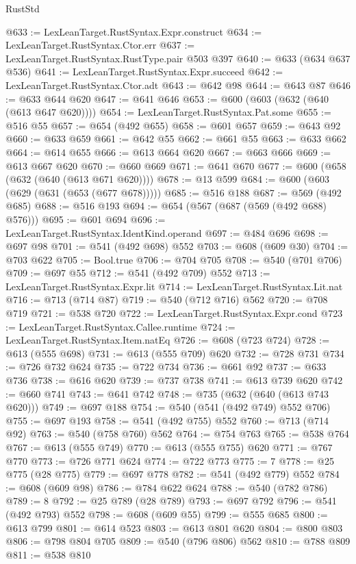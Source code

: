 \begin{lexlean}{RustStd}
\begin{coremodule}
@633 := LexLeanTarget.RustSyntax.Expr.construct
@634 := LexLeanTarget.RustSyntax.Ctor.err
@637 := LexLeanTarget.RustSyntax.RustType.pair @503 @397
@640 := @633 (@634 @637 @536)
@641 := LexLeanTarget.RustSyntax.Expr.succeed
@642 := LexLeanTarget.RustSyntax.Ctor.adt
@643 := @642 @98
@644 := @643 @87
@646 := @633 @644 @620
@647 := @641 @646
@653 := @600 (@603 (@632 (@640 (@613 @647 @620))))
@654 := LexLeanTarget.RustSyntax.Pat.some
@655 := @516 @55
@657 := @654 (@492 @655)
@658 := @601 @657
@659 := @643 @92
@660 := @633 @659
@661 := @642 @55
@662 := @661 @55
@663 := @633 @662
@664 := @614 @655
@666 := @613 @664 @620
@667 := @663 @666
@669 := @613 @667 @620
@670 := @660 @669
@671 := @641 @670
@677 := @600 (@658 (@632 (@640 (@613 @671 @620))))
@678 := @13 @599
@684 := @600 (@603 (@629 (@631 (@653 (@677 @678)))))
@685 := @516 @188
@687 := @569 (@492 @685)
@688 := @516 @193
@694 := @654 (@567 (@687 (@569 (@492 @688) @576)))
@695 := @601 @694
@696 := LexLeanTarget.RustSyntax.IdentKind.operand
@697 := @484 @696
@698 := @697 @98
@701 := @541 (@492 @698) @552
@703 := @608 (@609 @30)
@704 := @703 @622
@705 := Bool.true
@706 := @704 @705
@708 := @540 (@701 @706)
@709 := @697 @55
@712 := @541 (@492 @709) @552
@713 := LexLeanTarget.RustSyntax.Expr.lit
@714 := LexLeanTarget.RustSyntax.Lit.nat
@716 := @713 (@714 @87)
@719 := @540 (@712 @716) @562
@720 := @708 @719
@721 := @538 @720
@722 := LexLeanTarget.RustSyntax.Expr.cond
@723 := LexLeanTarget.RustSyntax.Callee.runtime
@724 := LexLeanTarget.RustSyntax.Item.natEq
@726 := @608 (@723 @724)
@728 := @613 (@555 @698)
@731 := @613 (@555 @709) @620
@732 := @728 @731
@734 := @726 @732 @624
@735 := @722 @734
@736 := @661 @92
@737 := @633 @736
@738 := @616 @620
@739 := @737 @738
@741 := @613 @739 @620
@742 := @660 @741
@743 := @641 @742
@748 := @735 (@632 (@640 (@613 @743 @620)))
@749 := @697 @188
@754 := @540 (@541 (@492 @749) @552 @706)
@755 := @697 @193
@758 := @541 (@492 @755) @552
@760 := @713 (@714 @92)
@763 := @540 (@758 @760) @562
@764 := @754 @763
@765 := @538 @764
@767 := @613 (@555 @749)
@770 := @613 (@555 @755) @620
@771 := @767 @770
@773 := @726 @771 @624
@774 := @722 @773
@775 := 7
@778 := @25 @775 (@28 @775)
@779 := @697 @778
@782 := @541 (@492 @779) @552
@784 := @608 (@609 @98)
@786 := @784 @622 @624
@788 := @540 (@782 @786)
@789 := 8
@792 := @25 @789 (@28 @789)
@793 := @697 @792
@796 := @541 (@492 @793) @552
@798 := @608 (@609 @55)
@799 := @555 @685
@800 := @613 @799
@801 := @614 @523
@803 := @613 @801 @620
@804 := @800 @803
@806 := @798 @804 @705
@809 := @540 (@796 @806) @562
@810 := @788 @809
@811 := @538 @810

\end{coremodule}
\end{lexlean}
